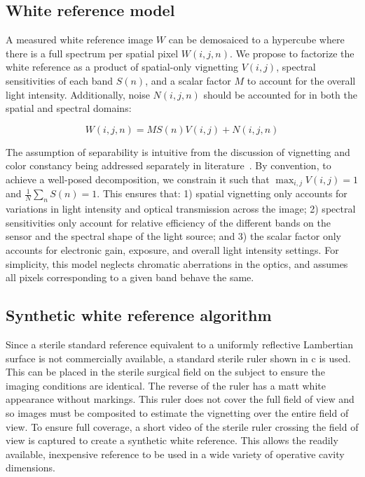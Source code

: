 % 
% 
% 
%
% 
% 
% 
% 
% 
% 
% 
% 
%
% 
% 
% 
% 
 

\subsection{White reference model}
\label{methodmodel}
A measured white reference image $W$ can be demosaiced to a hypercube where there is a full spectrum per spatial pixel $W(i,j,n)$. We propose to factorize the white reference as a product of spatial-only vignetting $V(i,j)$, spectral sensitivities of each band $S(n)$, and a scalar factor $M$ to account for the overall light intensity.
%
%
%
Additionally, noise $N(i,j,n)$ should be accounted for in both the spatial and spectral domains:
% 
\begin{linenomath*}
\begin{equation}
	W(i,j,n) = MS(n)V(i,j) + N(i,j,n)
\label{eq:modelling white references}
\end{equation}
\end{linenomath*}

The assumption of separability is intuitive from the discussion of vignetting and color constancy being addressed separately in literature~\citep{Cho2014,Ayala2020,Jiang2019,Yu2004,Foster2011}.
%
%
%
%
% 
%
By convention, to achieve a well-posed decomposition, we  constrain  it such that $\max_{i,j}V(i,j) = 1$ and $\frac{1}{N} \sum_{n}S(n) = 1$. 
%
%
This ensures that: 1) spatial vignetting only accounts for variations in light intensity and optical transmission across the image; 2) spectral sensitivities only account for relative efficiency of the different bands on the sensor and the spectral shape of the light source; and 3) the scalar factor only accounts for electronic gain, exposure, and overall light intensity settings.
%
%
For simplicity, this model neglects chromatic aberrations in the optics, and assumes all pixels corresponding to a given band behave the same. 

\subsection{Synthetic white reference algorithm}
\label{methodalgorithm}
Since a sterile standard reference equivalent to a uniformly reflective Lambertian surface is not commercially available, a standard sterile ruler shown in c is used. This can be placed in the sterile surgical field on the subject to ensure the imaging conditions are identical. The reverse of the ruler has a matt white appearance without markings.
This ruler does not cover the full field of view and so images must be composited to estimate the vignetting over the entire field of view.
% 
To ensure full coverage, a short video of the sterile ruler crossing the field of view is captured to create a synthetic white reference. This allows the readily available, inexpensive reference to be used in a wide variety of operative cavity dimensions.
% 
% 
%    
%     
%     
%     
% 

